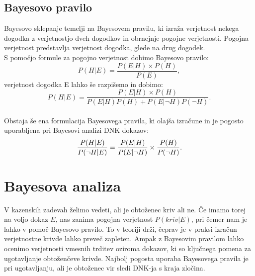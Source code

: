 \documentclass[12pt,a4paper]{amsart}
\theoremstyle{definition} %
\theoremstyle{plain} %
\begin{document}
\subsection{Bayesovo pravilo} 
Bayesovo sklepanje temelji na Bayesovem pravilu, ki izraža verjetnost nekega dogodka z verjetnostjo dveh dogodkov in obrnejnje pogojne
verjetnosti. Pogojna verjetnost predstavlja verjetnost dogodka, glede na drug dogodek. \\
 
S pomočjo formule za pogojno verjetnost dobimo Bayesovo pravilo:
\begin{equation}\label{eq:bpravilo}
    P(H \lvert E) = \frac{P(E \lvert H) \times P(H)}{P(E)},
\end{equation}
verjetnost dogodka E lahko še razpišemo in dobimo:
\begin{equation}\label{eq:b_pravilo}
    P(H \lvert E) = \frac{P(E \lvert H) \times P(H)}{P(E \lvert H)P(H) + P(E \lvert \neg H)P(\neg H)}.
\end{equation} \\

Obstaja še ena formulacija Bayesovega pravila, ki olajša izračune in je pogosto uporabljena pri Bayesovi analizi DNK dokazov:
\begin{equation}\label{eq:b_pravilo_DNK}
    \frac{P(H \lvert E)}{P(\neg H \lvert E)} = \frac{P(E \lvert H)}{P(E \lvert \neg H)} \times \frac{P(H)}{P(\neg H)\vspace{3mm}}.
\end{equation}

\section{Bayesova analiza}
V kazenskih zadevah želimo vedeti, ali je obtoženec kriv ali ne. Če imamo torej na voljo dokaz $E$, nas zanima pogojna verjetnost
$P(kriv \lvert E)$, pri čemer nam je lahko v pomoč Bayesovo pravilo. To v teoriji drži, čeprav je v praksi izračun verjetnostne krivde lahko
preveč zapleten. Ampak z Bayesovim pravilom lahko ocenimo verjetnosti vmesnih trditev oziroma dokazov, ki so ključnega pomena za ugotavljanje
obtoženčeve krivde. Najbolj pogosta uporaba Bayesovega pravila je pri ugotavljanju, ali je obtoženec vir sledi DNK-ja s kraja zločina. \\
\end{document}
